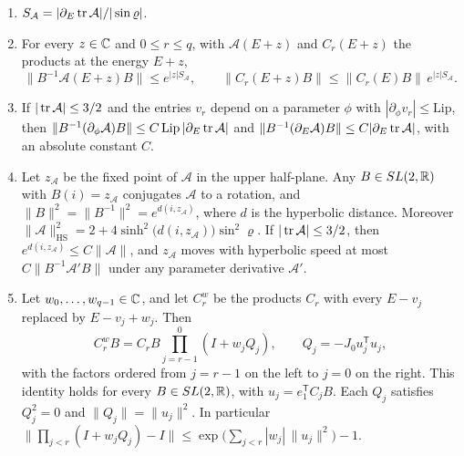\begin{lemma}\label{lem:blocks}
\begin{enumerate}
\item $S_{\mathcal A}=|\partial_E\operatorname{tr}\mathcal A|/|\sin\varrho|$.
\item For every $z\in\mathbb C$ and $0\le r\le q$, with $\mathcal A(E+z)$ and $C_r(E+z)$ the products at the energy $E+z$,
\[
\|B^{-1}\mathcal A(E+z)B\|\le e^{|z|S_{\mathcal A}},\qquad\|C_r(E+z)B\|\le\|C_r(E)B\|\,e^{|z|S_{\mathcal A}}.
\]
\item If $|\operatorname{tr}\mathcal A|\le3/2$ and the entries $v_r$ depend on a parameter $\phi$ with $|\partial_\phi v_r|\le\mathrm{Lip}$, then $\|B^{-1}(\partial_\phi\mathcal A)B\|\le C\,\mathrm{Lip}\,|\partial_E\operatorname{tr}\mathcal A|$ and $\|B^{-1}(\partial_E\mathcal A)B\|\le C|\partial_E\operatorname{tr}\mathcal A|$, with an absolute constant $C$.
\item Let $z_{\mathcal A}$ be the fixed point of $\mathcal A$ in the upper half-plane. Any $B\in SL(2,\mathbb R)$ with $B(i)=z_{\mathcal A}$ conjugates $\mathcal A$ to a rotation, and $\|B\|^2=\|B^{-1}\|^2=e^{d(i,z_{\mathcal A})}$, where $d$ is the hyperbolic distance. Moreover $\|\mathcal A\|_{\mathrm{HS}}^2=2+4\sinh^2\bigl(d(i,z_{\mathcal A})\bigr)\sin^2\varrho$. If $|\operatorname{tr}\mathcal A|\le3/2$, then $e^{d(i,z_{\mathcal A})}\le C\|\mathcal A\|$, and $z_{\mathcal A}$ moves with hyperbolic speed at most $C\|B^{-1}\mathcal A'B\|$ under any parameter derivative $\mathcal A'$.
\item Let $w_0,\dots,w_{q-1}\in\mathbb C$, and let $C^w_r$ be the products $C_r$ with every $E-v_j$ replaced by $E-v_j+w_j$. Then
\[
C^w_rB=C_rB\prod_{j=r-1}^{0}(I+w_jQ_j),\qquad Q_j=-J_0u_j^{\mathsf T}u_j,
\]
with the factors ordered from $j=r-1$ on the left to $j=0$ on the right. This identity holds for every $B\in SL(2,\mathbb R)$, with $u_j=e_1^{\mathsf T}C_jB$. Each $Q_j$ satisfies $Q_j^2=0$ and $\|Q_j\|=\|u_j\|^2$. In particular $\bigl\|\prod_{j<r}(I+w_jQ_j)-I\bigr\|\le\exp\bigl(\sum_{j<r}|w_j|\,\|u_j\|^2\bigr)-1$.
\end{enumerate}
\end{lemma}


